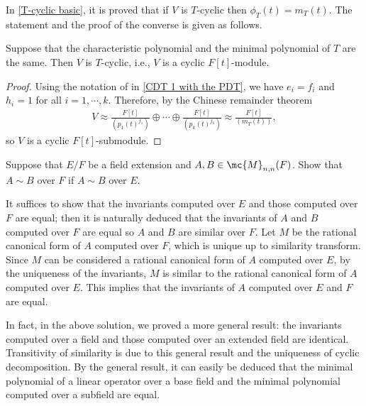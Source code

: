 In \cref{T-cyclic basic}, it is proved that if $V$ is $T$-cyclic then $\phi_T(t)=m_T(t)$.
The statement and the proof of the converse is given as follows.
\begin{prop}
    Suppose that the characteristic polynomial and the minimal polynomial of $T$ are the same.
    Then $V$ is $T$-cyclic, i.e., $V$ is a cyclic $F[t]$-module.
\end{prop}
\begin{proof}
    Using the notation of in \cref{CDT 1 with the PDT}, we have $e_i=f_i$ and $h_i=1$ for all $i=1, \cdots, k$.
    Therefore, by the Chinese remainder theorem
    \begin{align*}
        V\approx \frac{F[t]}{(p_1(t)^{f_1})}\oplus\cdots\oplus \frac{F[t]}{(p_k(t)^{f_k})}\approx \frac{F[t]}{(m_T(t))},
    \end{align*}
    so $V$ is a cyclic $F[t]$-submodule.
\end{proof}

\begin{prob}
    Suppose that $E/F$ be a field extension and $A, B\in\mc{M}_{n, n}(F)$.
    Show that $A\sim B$ over $F$ if $A\sim B$ over $E$.
\end{prob}
\begin{sol}
    It suffices to show that the invariants computed over $E$ and those computed over $F$ are equal; then it is naturally deduced that the invariants of $A$ and $B$ computed over $F$ are equal so $A$ and $B$ are similar over $F$.
    Let $M$ be the rational canonical form of $A$ computed over $F$, which is unique up to similarity transform.
    Since $M$ can be considered a rational canonical form of $A$ computed over $E$, by the uniqueness of the invariants, $M$ is similar to the rational canonical form of $A$ computed over $E$.
    This implies that the invariants of $A$ computed over $E$ and $F$ are equal.
\end{sol}
\begin{rmk}
    In fact, in the above solution, we proved a more general result: the invariants computed over a field and those computed over an extended field are identical.
    Transitivity of similarity is due to this general result and the uniqueness of cyclic decomposition.
    By the general result, it can easily be deduced that the minimal polynomial of a linear operator over a base field and the minimal polynomial computed over a subfield are equal.
\end{rmk}

